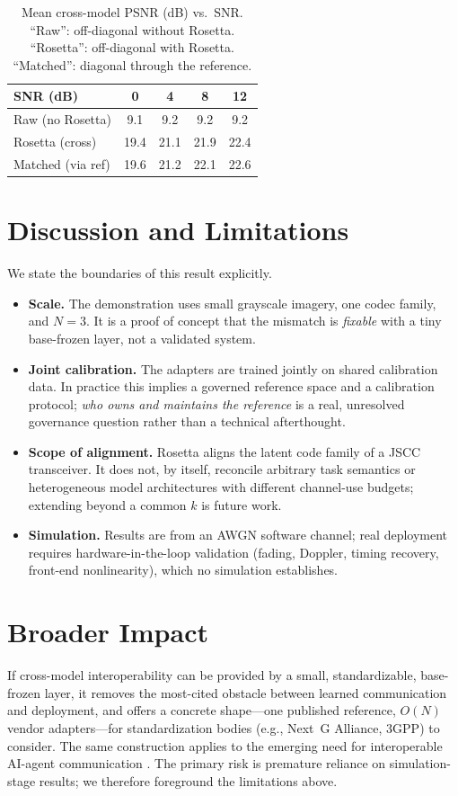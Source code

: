 \documentclass[11pt]{article}
\begin{document}
\begin{table}[h]
\centering
\caption{Mean cross-model PSNR (dB) vs.\ SNR. ``Raw'': off-diagonal without Rosetta.
``Rosetta'': off-diagonal with Rosetta. ``Matched'': diagonal through the reference.}
\label{tab:snr}
\small
\begin{tabular}{lcccc}
\toprule
SNR (dB) & 0 & 4 & 8 & 12\\
\midrule
Raw (no Rosetta)   & 9.1  & 9.2  & 9.2  & 9.2\\
Rosetta (cross)    & 19.4 & 21.1 & 21.9 & 22.4\\
Matched (via ref)  & 19.6 & 21.2 & 22.1 & 22.6\\
\bottomrule
\end{tabular}
\end{table}

\section{Discussion and Limitations}
We state the boundaries of this result explicitly.
\begin{itemize}
  \item \textbf{Scale.} The demonstration uses small grayscale imagery, one codec
        family, and $N=3$. It is a proof of concept that the mismatch is
        \emph{fixable} with a tiny base-frozen layer, not a validated system.
  \item \textbf{Joint calibration.} The adapters are trained jointly on shared
        calibration data. In practice this implies a governed reference space and a
        calibration protocol; \emph{who owns and maintains the reference} is a real,
        unresolved governance question rather than a technical afterthought.
  \item \textbf{Scope of alignment.} Rosetta aligns the latent code family of a JSCC
        transceiver. It does not, by itself, reconcile arbitrary task semantics or
        heterogeneous model architectures with different channel-use budgets; extending
        beyond a common $k$ is future work.
  \item \textbf{Simulation.} Results are from an AWGN software channel; real deployment
        requires hardware-in-the-loop validation (fading, Doppler, timing recovery,
        front-end nonlinearity), which no simulation establishes.
\end{itemize}

\section{Broader Impact}
If cross-model interoperability can be provided by a small, standardizable, base-frozen
layer, it removes the most-cited obstacle between learned communication and
deployment, and offers a concrete shape---one published reference, $O(N)$ vendor
adapters---for standardization bodies (e.g., Next~G Alliance, 3GPP) to consider. The
same construction applies to the emerging need for interoperable AI-agent
communication \cite{lacp2025}. The primary risk is premature reliance on
simulation-stage results; we therefore foreground the limitations above.
\end{document}
